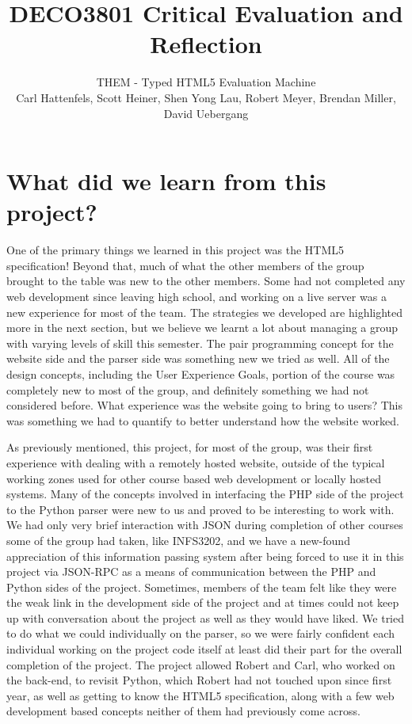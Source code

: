 \documentclass[10pt]{article}
\title{\bf DECO3801 Critical Evaluation and Reflection}
\author{\normalsize THEM - Typed HTML5 Evaluation Machine \\ \normalsize Carl Hattenfels, Scott Heiner, Shen Yong Lau, Robert Meyer, Brendan Miller, David Uebergang}
\date{}
\begin{document}
\maketitle

\section*{What did we learn from this project?}

One of the primary things we learned in this project was the HTML5 specification! Beyond that, much of what the other members of the group brought to the table was new to the other members. Some had not completed any web development since leaving high school, and working on a live server was a new experience for most of the team. The strategies we developed are highlighted more in the next section, but we believe we learnt a lot about managing a group with varying levels of skill this semester. The pair programming concept for the website side and the parser side was something new we tried as well. All of the design concepts, including the User Experience Goals, portion of the course was completely new to most of the group, and definitely something we had not considered before. What experience was the website going to bring to users? This was something we had to quantify to better understand how the website worked.

As previously mentioned, this project, for most of the group, was their first experience with dealing with a remotely hosted website, outside of the typical working zones used for other course based web development or locally hosted systems. Many of the concepts involved in interfacing the PHP side of the project to the Python parser were new to us and proved to be interesting to work with. We had only very brief interaction with JSON during completion of other courses some of the group had taken, like INFS3202, and we have a new-found appreciation of this information passing system after being forced to use it in this project via JSON-RPC as a means of communication between the PHP and Python sides of the project. Sometimes, members of the team felt like they were the weak link in the development side of the project and at times could not keep up with conversation about the project as well as they would have liked. We tried to do what we could individually on the parser, so we were fairly confident each individual working on the project code itself at least did their part for the overall completion of the project. The project allowed Robert and Carl, who worked on the back-end, to revisit Python, which Robert had not touched upon since first year, as well as getting to know the HTML5 specification, along with a few web development based concepts neither of them had previously come across.
\end{document}
